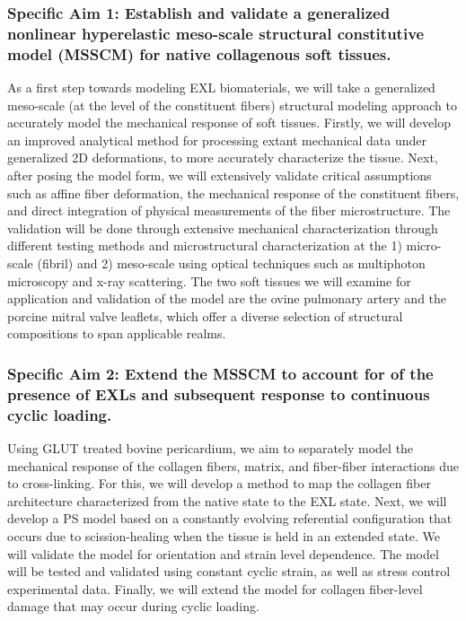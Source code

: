     \subsubsection*{Specific Aim 1: Establish and validate a generalized nonlinear hyperelastic meso-scale structural constitutive model (MSSCM) for native collagenous soft tissues.} As a first step towards modeling EXL biomaterials, we will take a generalized meso-scale (at the level of the constituent fibers) structural modeling approach to accurately model the mechanical response of soft tissues. Firstly, we will develop an improved analytical method for processing extant mechanical data under generalized 2D deformations, to more accurately characterize the tissue. Next, after posing the model form, we will extensively validate critical assumptions such as affine fiber deformation, the mechanical response of the constituent fibers, and direct integration of physical measurements of the fiber microstructure. The validation will be done through extensive mechanical characterization through different testing methods and microstructural characterization at the 1) micro-scale (fibril) and 2) meso-scale using optical techniques such as multiphoton microscopy and x-ray scattering. The two soft tissues we will examine for application and validation of the model are the ovine pulmonary artery and the porcine mitral valve leaflets, which offer a diverse selection of structural compositions to span applicable realms.
    


    \subsubsection*{Specific Aim 2: Extend the MSSCM to account for of the presence of EXLs and subsequent response to continuous cyclic loading.} Using GLUT treated bovine pericardium, we aim to separately model the mechanical response of the collagen fibers, matrix, and fiber-fiber interactions due to cross-linking. For this, we will develop a method to map the collagen fiber architecture characterized from the native state to the EXL state. Next, we will develop a PS model based on a constantly evolving referential configuration that occurs due to scission-healing when the tissue is held in an extended state. We will validate the model for orientation and strain level dependence. The model will be tested and validated using constant cyclic strain, as well as stress control experimental data. Finally, we will extend the model for collagen fiber-level damage that may occur during cyclic loading. 
    
